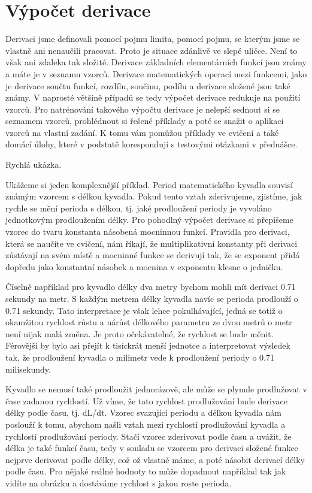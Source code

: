 \documentclass[12pt]{article}
\begin{document}
\newpage

\section*{Výpočet derivace}

Derivaci jsme definovali pomocí pojmu limita, pomocí pojmu, se kterým jsme se vlastně ani nenaučili pracovat. Proto je situace zdánlivě ve slepé uličce. Není to však ani zdaleka tak složité. Derivace základních elementárních funkcí jsou známy a máte je v seznamu vzorců. Derivace matematických operací mezi funkcemi, jako je derivace součtu funkcí, rozdílu, součinu, podílu a derivace složené jsou také známy. V naprosté většině případů se tedy výpočet derivace redukuje na použití vzorců. Pro natrénování takového výpočtu derivace je nelepší sednout si se seznamem vzorců, prohlédnout si řešené příklady a poté se snažit o aplikaci vzorců na vlastní zadání. K tomu vám pomůžou příklady ve cvičení a také domácí úlohy, které v podstatě korespondují s testovými otázkami v přednášce.

Rychlá ukázka.

Ukážeme si jeden komplexnější příklad. Period matematického kyvadla souvisí známým vzorcem s délkou kyvadla. Pokud tento vztah zderivujeme, zjistíme, jak rychle se mění perioda s délkou, tj. jaké prodloužení periody je vyvoláno jednotkovým prodloužením délky. Pro pohodlný výpočet derivace si přepíšeme vzorec do tvaru konstanta násobená mocninnou funkcí. Pravidla pro derivaci, která se naučíte ve cvičení, nám říkají, že multiplikativní konstanty při derivaci zůstávají na svém místě a mocninné funkce se derivují tak, že se exponent přidá dopředu jako konstantní násobek a mocnina v exponentu klesne o jedničku.

Číselně například pro kyvadlo délky dva metry bychom mohli mít derivaci 0.71 sekundy na metr. S každým metrem délky kyvadla navíc se perioda prodlouží o 0.71 sekundy. Tato interpretace je však lehce pokulhávající, jedná se totiž o okamžitou rychlost růstu a nárůst délkového parametru ze dvou metrů o metr není nijak malá změna. Je proto očekávatelné, že rychlost se bude měnit. Férovější by bylo asi přejít k tisíckrát menší jednotce a interpretovat výsledek tak, že prodloužení kyvadla o milimetr vede k prodloužení periody o 0.71 milisekundy.

Kyvadlo se nemusí také prodloužit jednorázově, ale může se plynule prodlužovat v čase zadanou rychlostí. Už víme, že tato rychlost prodlužování bude derivace délky podle času, tj. dL/dt. Vzorec svazující periodu a délkou kyvadla nám poslouží k tomu, abychom našli vztah mezi rychlostí prodlužování kyvadla a rychlostí prodlužování periody. Stačí vzorec zderivovat podle času a uvážit, že délka je také funkcí času, tedy v souladu se vzorcem pro derivaci složené funkce nejprve derivovat podle délky, což ož vlastně máme, a poté násobit derivací délky podle času. Pro nějaké reálné hodnoty to může dopadnout například tak jak vidíte na obrázku a dostáváme rychlost s jakou roste perioda.
\end{document}

